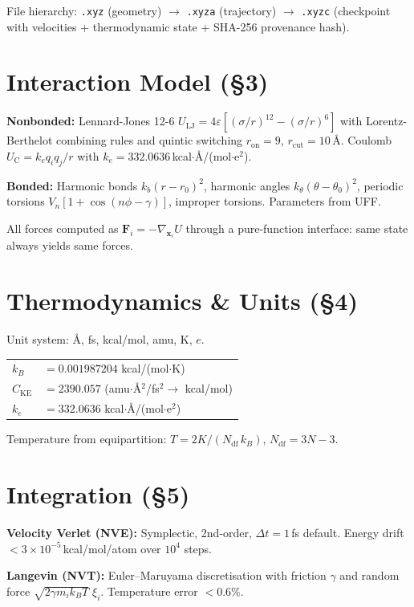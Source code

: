 \documentclass[10pt, a4paper, twocolumn]{article}
\begin{document}
File hierarchy: \texttt{.xyz} (geometry) $\to$ \texttt{.xyza}
(trajectory) $\to$ \texttt{.xyzc} (checkpoint with velocities +
thermodynamic state + SHA-256 provenance hash).

\section{Interaction Model (\S3)}

\textbf{Nonbonded:} Lennard-Jones 12-6
$U_\text{LJ} = 4\varepsilon[(\sigma/r)^{12} - (\sigma/r)^6]$
with Lorentz-Berthelot combining rules and quintic switching
$r_\text{on}{=}9$, $r_\text{cut}{=}10$\,{\AA}.
Coulomb $U_\text{C} = k_e q_i q_j / r$ with
$k_e = 332.0636$\,kcal$\cdot${\AA}/(mol$\cdot$e$^2$).

\textbf{Bonded:} Harmonic bonds $k_b(r{-}r_0)^2$, harmonic angles
$k_\theta(\theta{-}\theta_0)^2$, periodic torsions
$V_n[1{+}\cos(n\phi{-}\gamma)]$, improper torsions.
Parameters from UFF.

All forces computed as $\mathbf{F}_i = -\nabla_{\mathbf{x}_i} U$
through a pure-function interface: same state always yields same
forces.

\section{Thermodynamics \& Units (\S4)}

Unit system: {\AA}, fs, kcal/mol, amu, K, $e$.

\begin{tabular}{@{}ll@{}}
$k_B$ & $= 0.001987204$ kcal/(mol$\cdot$K)\\
$C_\text{KE}$ & $= 2390.057$ (amu$\cdot${\AA}$^2$/fs$^2 \to$ kcal/mol)\\
$k_e$ & $= 332.0636$ kcal$\cdot${\AA}/(mol$\cdot$e$^2$)
\end{tabular}

Temperature from equipartition:
$T = 2K / (N_\text{df}\, k_B)$, \;
$N_\text{df} = 3N - 3$.

\section{Integration (\S5)}

\textbf{Velocity Verlet (NVE):} Symplectic, 2nd-order,
$\Delta t = 1$\,fs default.  Energy drift
$< 3 \times 10^{-5}$\,kcal/mol/atom over $10^4$ steps.

\textbf{Langevin (NVT):} Euler--Maruyama discretisation with friction
$\gamma$ and random force
$\sqrt{2\gamma m_i k_B T}\;\xi_i$.
Temperature error $< 0.6\%$.
\end{document}
